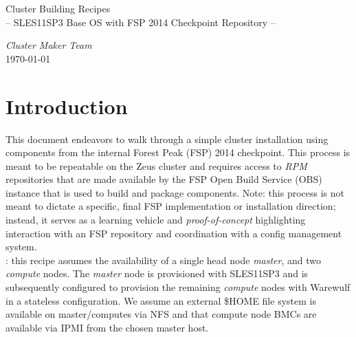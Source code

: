 \documentclass[letterpaper]{article}
\newcommand{\baseOS}{SLES11SP3}
\begin{document}


\begin{center}
\vspace*{-0.5cm}
{\Large Cluster Building Recipes} \\ \vspace*{0.2cm}
{\large -- \baseOS{} Base OS with FSP 2014 Checkpoint Repository -- } \\ \vspace*{0.75cm}

{\large \em Cluster Maker Team} \\
\today
\end{center}


\section{Introduction}
This document endeavors to walk through a simple cluster installation using
components from the internal Forest Peak (FSP) 2014 checkpoint. This process is
meant to be repeatable on the Zeus cluster and requires access to {\em RPM}
repositories that are made available by the FSP Open Build Service (OBS)
instance that is used to build and package components. Note: this process is
not meant to dictate a specific, final FSP implementation or installation
direction; instead, it serves as a learning vehicle and {\em proof-of-concept}
highlighting interaction with an FSP repository and coordination with a config
management system. \\

: this recipe assumes the availability of a single head node
	  {\em master}, and two {\em compute} nodes. The {\em master} node is
	  provisioned with \baseOS{} and is subsequently configured to
	  provision the remaining {\em compute} nodes with Warewulf in a
	  stateless configuration. We assume an external \$HOME file system is
	  available on master/computes via NFS and that compute node BMCs are
	  available via IPMI from the chosen master host. \\
\end{document}
